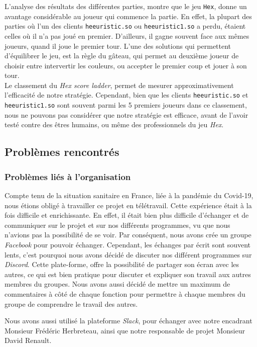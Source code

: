 \documentclass[a4paper,10pt]{article}
\begin{document}
L'analyse des résultats des différentes parties, montre que le jeu \texttt{Hex}, donne un avantage considérable au joueur qui commence la partie. En effet, la plupart des parties où l'un des clients \texttt{heeuristic.so} ou \texttt{heeuristic1.so} a perdu, étaient celles où il n'a pas joué en premier. D'ailleurs, il gagne souvent face aux mêmes joueurs, quand il joue le premier tour. L'une des solutions qui permettent d'équilibrer le jeu, est la règle du gâteau, qui permet au deuxième joueur de choisir entre intervertir les couleurs, ou accepter le premier coup et jouer à son tour. \\ 


Le classement du \textit{Hex score ladder}, permet de mesurer approximativement l'efficacité de notre stratégie. Cependant, bien que les clients \texttt{heeuristic.so} et \texttt{heeuristic1.so} sont souvent parmi les 5 premiers joueurs dans ce classement, nous ne pouvons pas considérer que notre stratégie est efficace, avant de l'avoir testé contre des êtres humains, ou même des professionnels du jeu \textit{Hex}.

\subsection{Problèmes rencontrés}
\subsubsection{Problèmes liés à l'organisation}
Compte tenu de la situation sanitaire en France, liée à la pandémie du Covid-19, nous étions obligé à travailler ce projet en télétravail. Cette expérience était à la fois difficile et enrichissante. En effet, il était bien plus difficile d’échanger et de communiquer sur le projet et sur nos différents programmes, vu que nous n'avions pas la possibilité de se voir. Par conséquent, nous avons crée un groupe \textit{Facebook} pour pouvoir échanger. Cependant, les échanges par écrit sont souvent lents, c'est pourquoi nous avons décidé de discuter nos différent programmes sur \textit{Discord}. Cette plate-forme, offre la possibilité de partager son écran avec les autres, ce qui est bien pratique pour discuter et expliquer son travail aux autres membres du groupes. Nous avons aussi décidé de mettre un maximum de commentaires à côté de chaque fonction pour permettre à chaque membres du groupe de comprendre le travail des autres.
\newline

Nous avons aussi utilisé la plateforme \textit{Slack}, pour échanger avec notre encadrant Monsieur Frédéric Herbreteau, ainsi que notre responsable de projet Monsieur David Renault.
\newline
\end{document}
